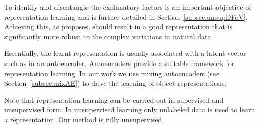 \documentclass[12pt,a4paper]{article}
\begin{document}
To identify and disentangle the explanatory factors is an important objective of representation learning and is further detailed in Section~\ref{subsec:unsupDFoV}. Achieving this, as \cite{ReprLearning} proposes, should result in a good representation that is significantly more robust to the complex variations in natural data. 

Essentially, the learnt representation is usually associated with a latent vector such as in an autoencoder. Autoencoders provide a suitable framework for representation learning. In our work we use mixing autoencoders (see Section~\ref{subsec:mixAE}) to drive the learning of object representations.

Note that representation learning can be carried out in supervised and unsupervised form. In unsupervised learning only unlabeled data is used to learn a representation. Our method is fully unsupervised.



% 
\end{document}
